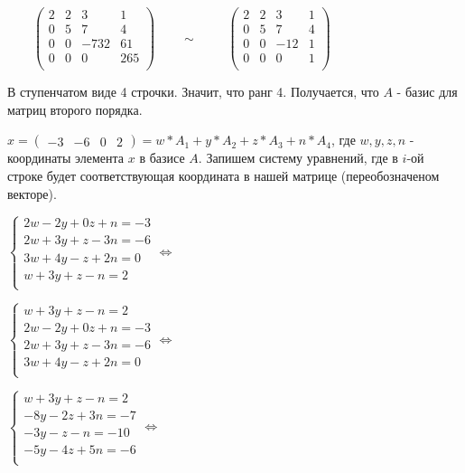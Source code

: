 \begin{enumerate}
	$\qquad\begin{pmatrix}
	2 & 2 & 3 & 1\\
	0 & 5 & 7 & 4\\
	0 & 0 & -732 & 61\\
	0 & 0 & 0 & 265\\
	\end{pmatrix}\qquad \sim $
	$\qquad\begin{pmatrix}
	2 & 2 & 3 & 1\\
	0 & 5 & 7 & 4\\
	0 & 0 & -12 & 1\\
	0 & 0 & 0 & 1\\
	\end{pmatrix}\qquad $

	В ступенчатом виде 4 строчки. Значит, что ранг 4.
	Получается, что $A$ - базис для матриц второго порядка.

	$x = \begin{pmatrix}-3 & -6 & 0 & 2\end{pmatrix} = w*A_1 + y*A_2 + z*A_3 + n*A_4$,
	где $w,y,z,n$ - координаты элемента $x$ в базисе $A$.
	Запишем систему уравнений, где в $i$-ой строке будет соответствующая координата в нашей матрице (переобозначеном векторе).

	\begin{multicols}{2}
	$ \begin{cases}
	2w -2y + 0z + n = -3\\
	2w + 3y + z -3n = -6\\
	3w + 4y - z + 2n = 0\\
	w + 3y + z - n = 2\\
	\end{cases} \Longleftrightarrow $

	$ \begin{cases}
	w + 3y + z - n = 2 \\
	2w -2y + 0z + n = -3\\
	2w + 3y + z -3n = -6\\
	3w + 4y - z + 2n = 0\\
	\end{cases} \Longleftrightarrow  $

	$ \begin{cases}
	w + 3y + z - n = 2 \\
	 -8y - 2z + 3n = -7\\
	 -3y -z -n = -10\\
	  -5y - 4z + 5n = -6\\
	\end{cases}  \Longleftrightarrow $


\end{multicols}
\end{enumerate}
